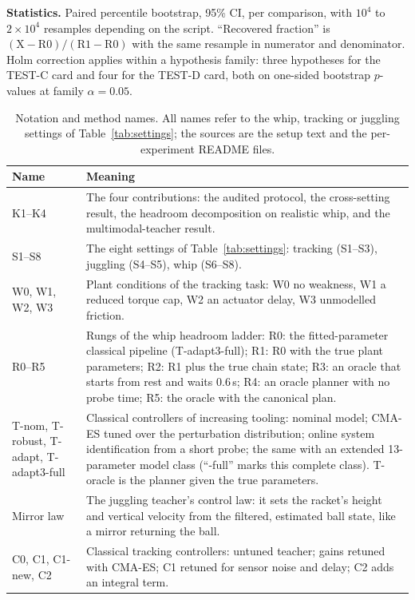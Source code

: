 \textbf{Statistics.} Paired percentile bootstrap, 95\% CI, per comparison, with $10^4$ to $2{\times}10^4$ resamples depending on the script. ``Recovered fraction'' is $(\text{X}-\text{R0})/(\text{R1}-\text{R0})$ with the same resample in numerator and denominator. Holm correction applies within a hypothesis family: three hypotheses for the TEST-C card and four for the TEST-D card, both on one-sided bootstrap $p$-values at family $\alpha=0.05$.

\begin{table}[t]
\centering
\caption{Notation and method names. All names refer to the whip, tracking or juggling settings of Table~\ref{tab:settings}; the sources are the setup text and the per-experiment README files.}
\label{tab:glossary}
\footnotesize
\begin{tabular}{@{}p{2.7cm}p{14.4cm}@{}}
\toprule
Name & Meaning \\ \midrule
K1--K4 & The four contributions: the audited protocol, the cross-setting result, the headroom decomposition on realistic whip, and the multimodal-teacher result. \\
S1--S8 & The eight settings of Table~\ref{tab:settings}: tracking (S1--S3), juggling (S4--S5), whip (S6--S8). \\
W0, W1, W2, W3 & Plant conditions of the tracking task: W0 no weakness, W1 a reduced torque cap, W2 an actuator delay, W3 unmodelled friction. \\
R0--R5 & Rungs of the whip headroom ladder: R0: the fitted-parameter classical pipeline (T-adapt3-full); R1: R0 with the true plant parameters; R2: R1 plus the true chain state; R3: an oracle that starts from rest and waits 0.6\,s; R4: an oracle planner with no probe time; R5: the oracle with the canonical plan. \\
T-nom, T-robust, T-adapt, T-adapt3-full & Classical controllers of increasing tooling: nominal model; CMA-ES tuned over the perturbation distribution; online system identification from a short probe; the same with an extended 13-parameter model class (``-full'' marks this complete class). T-oracle is the planner given the true parameters. \\
Mirror law & The juggling teacher's control law: it sets the racket's height and vertical velocity from the filtered, estimated ball state, like a mirror returning the ball. \\
C0, C1, C1-new, C2 & Classical tracking controllers: untuned teacher; gains retuned with CMA-ES; C1 retuned for sensor noise and delay; C2 adds an integral term. \\

\end{tabular}
\end{table}
